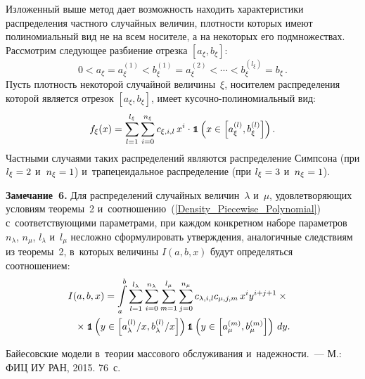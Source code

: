 \begin{multicols}{2}
\smallskip


Изложенный выше метод дает возможность находить характеристики 
распределения частного случайных величин, плотности которых имеют 
полиномиальный вид не на всем носителе, а на некоторых его подмножествах. 
Рассмотрим следующее разбиение отрезка $[a_\xi,b_\xi]$:
$$
0<a_\xi=a_\xi^{(1)}<b_\xi^{(1)}=a_\xi^{(2)}<\cdots<b_\xi^{(l_\xi)}=b_\xi\,.
$$
Пусть плотность некоторой случайной величины~$\xi$, носителем распределения 
которой является отрезок $[a_\xi,b_\xi]$, имеет ку\-соч\-но-по\-ли\-но\-ми\-аль\-ный вид:
\begin{equation}
f_\xi(x)=\sum\limits_{l=1}^{l_\xi}\sum\limits_{i=0}^{n_\xi}c_{\xi,i,l}\, 
x^i\cdot\mbox{{\small \tt {1}}\hspace{-1.3mm}{\tt 1}}\left(x\in\left[a_\xi^{(l)},b_\xi^{(l)}\right]\right).
\label{Density_Piecewise_Polynomial}
\end{equation}
Частными случаями таких распределений являются распределение 
Симпсона (при $l_\xi\hm=2$ и~$n_\xi\hm=1$) и~трапецеидальное распределение 
(при $l_\xi\hm=3$ и~$n_\xi\hm=1$).

\smallskip

\noindent
\textbf{Замечание~6.} Для распределений случайных величин~$\lambda$ и~$\mu$, 
удовлетворяющих условиям теоремы~2 и~соотношению~(\ref{Density_Piecewise_Polynomial}) 
с~соответствующими параметрами, при каждом конкретном наборе параметров~$n_\lambda$, 
$n_\mu$, $l_\lambda$ и~$l_\mu$ несложно сформулировать утверждения, 
аналогичные следствиям из теоремы~2, в~которых величины $I(a,b,x)$ будут 
определяться соотношением:
\begin{multline*}
\!\!\!I(a,b,x)=\int\limits_{a}^{b}\sum\limits_{l=1}^{l_\lambda}\sum\limits_{i=0}^{n_\lambda}
\sum\limits_{m=1}^{l_\mu}\sum\limits_{j=0}^{n_\mu}c_{\lambda,i,l}
c_{\mu,j,m}\, x^iy^{i+j+1}\times{}\ \\
{}\times\mbox{{\small \tt {1}}\hspace{-1.3mm}{\tt 1}}\left(y\in\left[a_\lambda^{(l)}/x,b_\lambda^{(l)}/x\right]\right)
\mbox{{\small \tt {1}}\hspace{-1.3mm}{\tt 1}}\left(y\in\left[a_\mu^{(m)},b_\mu^{(m)}
\right]\right)\, dy.
\end{multline*}

{\small\frenchspacing
 {%
 \begin{thebibliography}{9}

Байесовские модели в~тео\-рии массового обслуживания и~надежности.~--- 
М.: ФИЦ ИУ РАН, 2015. 76~с.

\end{thebibliography}

 }
 }

\end{multicols}

